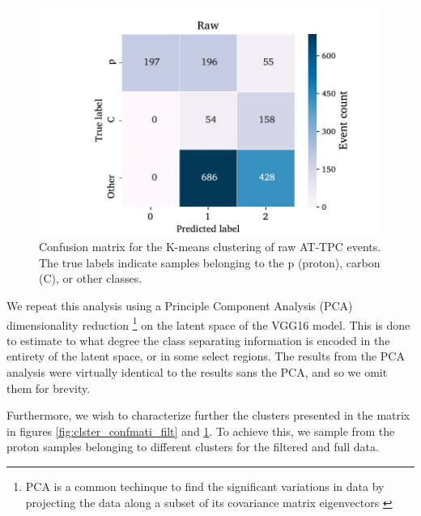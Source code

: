 \documentclass[review,number,sort&compress]{elsarticle}
\begin{document}
\begin{figure}
	\includegraphics[width=\textwidth]{custom_work/Rawvgg_conf_mat.pdf}
\caption[Pre-trained network - confusion matrices]{Confusion matrix for the K-means clustering of raw AT-TPC events. The true labels indicate samples belonging to the p (proton), carbon (C), or other classes. }\label{fig:clster_confmati_raw}
\end{figure}

We repeat this analysis using a Principle Component Analysis (PCA) dimensionality reduction \footnote{
PCA is a common techinque to find the significant variations in data by projecting the data along a subset of its covariance matrix eigenvectors \cite{Marsland2009}
} on the latent space of the VGG16 model. This is done to estimate to what degree the class separating information is encoded in the entirety of the latent space, or in some select regions. The results from the PCA analysis were virtually identical to the results sans the PCA, and so we omit them for brevity. 

Furthermore, we wish to characterize further the clusters presented in the matrix in figures \ref{fig:clster_confmati_filt} and \ref{fig:clster_confmati_raw}. To achieve this, we sample from the proton samples belonging to different clusters for the filtered and full data.
\end{document}
